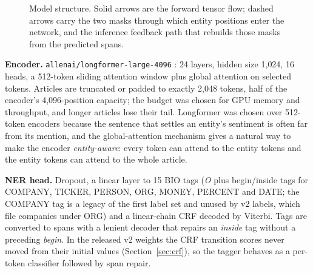 \documentclass[11pt,letterpaper]{article}
\newcommand{\code}[1]{\texttt{#1}}
\newcommand{\vm}{\bm{m}}
\begin{document}
\begin{figure}[!t]
{}
\caption{Model structure. Solid arrows are the forward tensor flow; dashed arrows carry the two
masks through which entity positions enter the network, and the inference feedback path that
rebuilds those masks from the predicted spans.}
\label{fig:overview}
\end{figure}

\textbf{Encoder.} \code{allenai/longformer-large-4096} \cite{beltagy2020longformer}: 24 layers,
hidden size 1{,}024, 16 heads, a 512-token sliding attention window plus global attention on
selected tokens. Articles are truncated or padded to exactly 2{,}048 tokens, half of the
encoder's 4{,}096-position capacity; the budget was chosen for GPU memory and throughput, and
longer articles lose their tail. Longformer was chosen over 512-token encoders because the sentence that settles an
entity's sentiment is often far from its mention, and the global-attention mechanism gives a
natural way to make the encoder \emph{entity-aware}: every token can attend to the entity tokens
and the entity tokens can attend to the whole article.

\textbf{NER head.} Dropout, a linear layer to 15 BIO tags (\emph{O} plus begin/inside tags for
COMPANY, TICKER, PERSON, ORG, MONEY, PERCENT and DATE; the COMPANY tag is a legacy of the first
label set and unused by v2 labels, which file companies under ORG) and a linear-chain CRF decoded
by Viterbi. Tags are converted to spans with a lenient decoder that repairs an \emph{inside} tag
without a preceding \emph{begin}. In the released v2 weights the CRF transition scores never
moved from their initial values (Section~\ref{sec:crf}), so the tagger behaves as a per-token
classifier followed by span repair.
\end{document}
